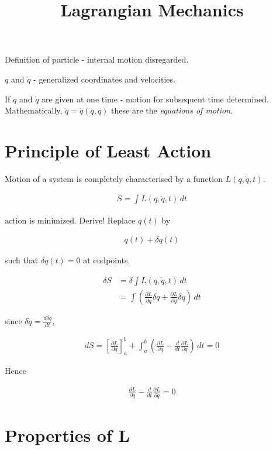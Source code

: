 \documentclass{article}
\title{Lagrangian Mechanics}
\date{}
\begin{document}
\maketitle

Definition of particle - internal motion disregarded.

$q$ and $\dot{q}$ - generalized coordinates and velocities.

If $q$ and $\dot{q}$ are given at one time - motion for subsequent time determined. Mathematically, $\ddot{q} = \ddot{q}(q,\dot{q})$ these are the \emph{equations of motion}.

\section{Principle of Least Action}

Motion of a system is completely characterised by a function $L(q, \dot{q}, t)$. 

\begin{align}
S = \int L(q,\dot{q},t)\,dt
\end{align}

action is minimized. Derive! Replace $q(t)$ by 

\begin{align}
q(t) + \delta q(t)
\end{align}

such that $\delta q(t) = 0$ at endpoints.

\begin{align}
\delta S &= \delta \int L(q,\dot{q},t)\,dt\\
&= \int \left(\frac{\partial L}{\partial q} \delta q + \frac{\partial L}{\partial \dot{q}} \delta \dot{q}\right)\,dt
\end{align}

since $\delta{\dot{q}} = \frac{d \delta q}{d t}$, 

\begin{align}
dS = \left[\frac{\partial L}{\partial \dot{q}}\right]_a^b + \int_a^b \left(\frac{\partial L}{\partial q} - \frac{d}{dt} \frac{\partial L}{\partial \dot{q}}\right)\,dt = 0
\end{align}

Hence 

\begin{align}
\frac{\partial L}{\partial q} - \frac{d}{dt} \frac{\partial L}{\partial \dot{q}} = 0 
\end{align}

\section{Properties of L}
\end{document}
